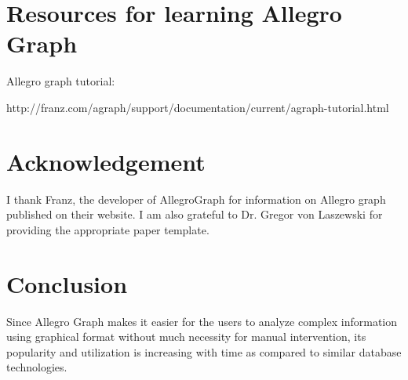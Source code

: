 \documentclass[9pt,twocolumn,twoside]{../../styles/osajnl}
\begin{document}
\section{Resources for learning Allegro Graph}
Allegro graph tutorial:

http://franz.com/agraph/support/documentation/current/agraph-tutorial.html

\cite{tut}

\section{Acknowledgement}
I thank Franz, the developer of AllegroGraph for information on Allegro graph published on their website. I am also grateful to Dr. Gregor von Laszewski for providing the appropriate paper template.


\section{Conclusion}
Since Allegro Graph makes it easier for the users to analyze complex information using graphical format without much necessity for manual intervention, its popularity and utilization is increasing with time as compared to similar database technologies.




\end{document}

